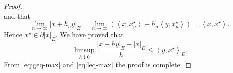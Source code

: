 \documentclass[10pt, reqno]{amsart}
\theoremstyle{definition}
\numberwithin{lem}{section}
\numberwithin{cor}{section}
\numberwithin{prop}{section}
\numberwithin{thm}{section}
\numberwithin{dfn}{section}
\begin{document}
\begin{proof}
\begin{equation*}
		\end{equation*}
		and that
		\begin{equation*}
			\lim_{n \to \infty} |x + h_n y|_E =\lim_{n \to \infty}\left( \left< x,x_{n}^\star \right> + h_n \left< y, x_{n}^\star\right>\right)  = \left<x,x^\star\right>.
		\end{equation*}
		Hence $x^\star \in \partial |x|_E$.
		We have proved that 
		\begin{equation} \label{eq:leq-max}
			\limsup_{h \downarrow 0} \frac{|x + hy|_E - |x|_E}{h} \leq \left<y,x^\star \right>_E.
		\end{equation}
		From \eqref{eq:geq-max} and \eqref{eq:leq-max} the proof is complete.
	\end{proof}   
     
	 
 


  
	   \nocite{}
	   
	   



 

 







 
\end{document}
